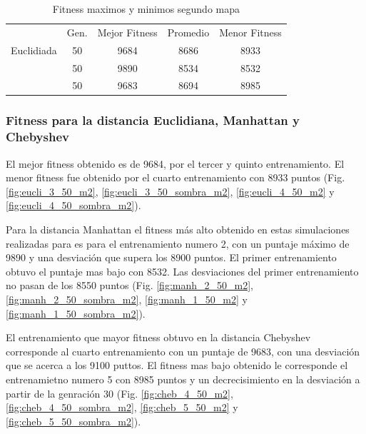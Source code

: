 \documentclass[lettersize, journal]{IEEEtran}
\begin{document}
\begin{table}[ht]
    \centering
    \caption{Fitness maximos y minimos segundo mapa}
    \label{tab:fitness_generaciones_maximos_minimos_mapa2}
    \begin{tabular}{c|c|c|c|c}
     & \multicolumn{1}{c|}{Gen.} &\multicolumn{1}{c|}{Mejor Fitness} & \multicolumn{1}{c|}{Promedio} & \multicolumn{1}{c}{Menor Fitness} \\ \cline{1-5}
    
    \multirow{1}{*}{Euclidiada} & 50 & 9684 & 8686 & 8933\\ \cline{2-5} \hhline{=====}    
    \multirow{1}{*}{Manhattan}  & 50 & 9890 & 8534 & 8532\\ \cline{2-5} \hhline{=====}
    
    \multirow{1}{*}{Chebyshev}  & 50 & 9683 & 8694 & 8985\\ \cline{2-5} \hline
    
    \end{tabular}
\end{table}
    


\subsubsection{Fitness para la distancia Euclidiana, Manhattan y Chebyshev}
El mejor fitness obtenido es de 9684, por el tercer y quinto entrenamiento. El menor fitness fue obtenido por el cuarto entrenamiento con 8933 puntos (Fig. \ref{fig:eucli_3_50_m2}, \ref{fig:eucli_3_50_sombra_m2}, \ref{fig:eucli_4_50_m2} y \ref{fig:eucli_4_50_sombra_m2}).

Para la distancia Manhattan el fitness más alto obtenido en estas simulaciones realizadas para es para el entrenamiento numero 2, con un puntaje máximo de 9890 y una desviación que supera los 8900 puntos.  El primer entrenamiento obtuvo el puntaje mas bajo con 8532. Las desviaciones del primer entrenamiento no pasan de los 8550 puntos (Fig. \ref{fig:manh_2_50_m2}, \ref{fig:manh_2_50_sombra_m2}, \ref{fig:manh_1_50_m2} y \ref{fig:manh_1_50_sombra_m2}).

El entrenamiento que mayor fitness obtuvo en la distancia Chebyshev corresponde al cuarto entrenamiento con un puntaje de 9683, con una desviación que se acerca a los 9100 puttos. El fitness mas bajo obtenido le corresponde el entrenamietno numero 5 con 8985 puntos y un decrecisimiento en la desviación a partir de la genración 30 (Fig. \ref{fig:cheb_4_50_m2}, \ref{fig:cheb_4_50_sombra_m2}, \ref{fig:cheb_5_50_m2} y \ref{fig:cheb_5_50_sombra_m2}).
\end{document}
